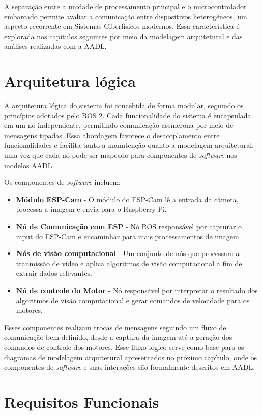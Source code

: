 A separação entre a unidade de processamento principal e o microcontrolador embarcado permite avaliar a comunicação entre dispositivos heterogêneos, um aspecto recorrente em Sistemas Ciberfísicos modernos. Essa característica é explorada nos capítulos seguintes por meio da modelagem arquitetural e das análises realizadas com a AADL.


\section{Arquitetura lógica}

A arquitetura lógica do sistema foi concebida de forma modular, seguindo os princípios
adotados pelo ROS 2. Cada funcionalidade do sistema é encapsulada em um nó independente,
permitindo comunicação assíncrona por meio de mensagens tipadas. Essa abordagem favorece o desacoplamento entre funcionalidades e facilita tanto a manutenção quanto a modelagem arquitetural, uma vez que cada nó pode ser mapeado para componentes de \textit{software} nos modelos AADL.

Os componentes de \textit{software} incluem:

\begin{itemize}
    \item \textbf{Módulo ESP-Cam} - O módulo do ESP-Cam lê a entrada da câmera, processa a imagem e envia para o Raspberry Pi.
    \item \textbf{Nó de Comunicação com ESP} - Nó ROS responsável por capturar o input do ESP-Cam e encaminhar para mais processamentos de imagem.
    \item \textbf{Nós de visão computacional} - Um conjunto de nós que processam a tranmissão de vídeo e aplica algoritmos de visão computacional a fim de extrair dados relevantes.
    \item \textbf{Nó de controle do Motor} - Nó responsável por interpretar o resultado dos algoritmos de visão computacional e gerar comandos de velocidade para os motores.
\end{itemize}

Esses componentes realizam trocas de mensagens seguindo um fluxo de comunicação bem definido, desde a captura da imagem até a geração dos comandos de controle dos motores. Esse fluxo lógico serve como base para os diagramas de modelagem arquitetural apresentados no próximo capítulo, onde os componentes de \textit{software} e suas interações são formalmente descritos em AADL.


\section{Requisitos Funcionais}

